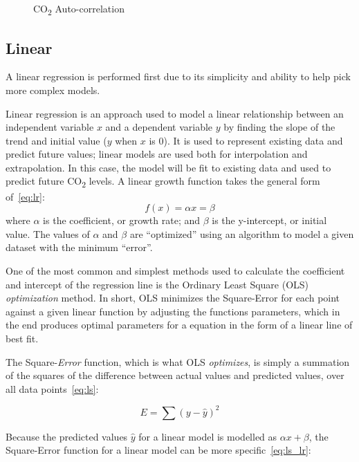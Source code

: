 \documentclass[12pt]{mcmthesis}
\begin{document}
\begin{figure}[h]
\begin{minipage}{.5\textwidth}
            \caption{CO\textsubscript{2} Auto-correlation}
            \label{fig:co2_acf}
        \end{minipage}
    \end{figure}

    \subsection{Linear}
    A linear regression is performed first due to its simplicity and ability to help pick more complex models.

    Linear regression is an approach used to model a linear relationship between an independent variable $x$ and a dependent variable $y$ by finding the slope of the trend and initial value ($y$ when $x$ is 0).
    It is used to represent existing data and predict future values; linear models are used both for interpolation and extrapolation. In this case, the model will be fit to existing data and used to predict future CO\textsubscript{2} levels.
    A linear growth function takes the general form of~\eqref{eq:lr}:
%
    \begin{equation}
        f(x) = \alpha x = \beta
        \label{eq:lr}
    \end{equation}
%
    \noindent where $\alpha$ is the coefficient, or growth rate; and $\beta$ is the y-intercept, or initial value.
    The values of $\alpha$ and $\beta$ are ``optimized'' using an algorithm to model a given dataset with the minimum ``error''.

    One of the most common and simplest methods used to calculate the coefficient and intercept of the regression line is the Ordinary Least Square (OLS) \textit{optimization} method.
    In short, OLS minimizes the Square-Error for each point against a given linear function by adjusting the function\textquotesingle s parameters, which in the end produces optimal parameters for a equation in the form of a linear line of best fit.

    The Square-\textit{Error} function, which is what OLS \textit{optimizes}, is simply a summation of the squares of the difference between actual values and predicted values, over all data points~\eqref{eq:ls}:

    \begin{equation}
        E = \sum{(y - \hat{y})^2}
        \label{eq:ls}
    \end{equation}

    Because the predicted values $\hat{y}$ for a linear model is modelled as $\alpha x + \beta$, the Square-Error function for a linear model can be more specific~\eqref{eq:ls_lr}:
\end{document}
